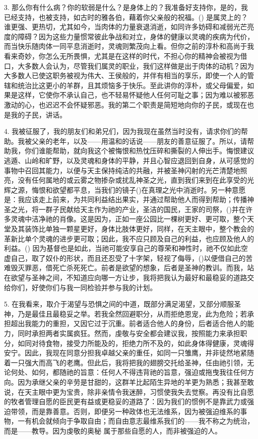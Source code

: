 3. 那么你有什么病？你的软弱是什么？是身体上的？我准备好支持你，是的，我已经支持，也被支持，如古时的雅各伯，藉着你父亲般的祝福。() 是属灵上的？谁更强、更热切，尤其如今，当肉体的力量衰退消逝，如同许多妨碍和减弱光芒亮度的障碍？因为这些力量惯常彼此争战和对立，身体的健康以灵魂的疾病为代价，而当快乐随肉体一同平息消逝时，灵魂则繁茂向上看。但你之前的淳朴和高尚于我看来奇妙，你怎么无所畏惧，尤其是在这样的时代，不担心你的精神会被视为借口，大多数人会认为，尽管我们属灵的职业，我们这样做是出于肉体的动机？因为大多数人已使这职务被视为伟大、王侯般的，并伴有相当的享乐，即使一个人的管辖和统治比这更小的羊群，且其烦恼多于快乐。至此讲你的淳朴，或父母偏爱，如果是这样，它使你不承认自己，也不轻易怀疑他人任何可耻之事；因为难以被邪恶激动的心，也迟迟不会怀疑邪恶。我的第二个职责是简短地向你的子民，或现在也是我的子民，讲话。\par

4. 我被征服了，我的朋友们和弟兄们，因为我现在虽然当时没有，请求你们的帮助。我被父亲的老年，以及——用温和的话说——朋友的善意征服了。所以，请帮助我，你们谁能帮助，就向我这个被悔恨和热忱压碎和撕裂的人伸出手。悔恨建议逃遁、山岭和旷野，以及灵魂和身体的平静，并且心智应退回到自身，从可感觉的事物中召回其能力，以便与天主保持纯洁的共融，并被圣神闪射的光芒清楚地照亮，没有任何属地的或云雾之物掺杂或扰乱神圣之光，直到我们来到在此享受的光辉之源，悔恨和欲望都平息，当我们的镜子()在真理之光中消逝时。另一种意愿是：我应该走上前来，为共同利益结出果实，并通过帮助他人而得到帮助；传播神圣之光，将一群子民献给天主作为祂的产业，圣洁的国民，王家的司祭，()并在许多灵魂中洁净祂的肖像。这是因为，正如一座公园比一棵树更好、更可取，整个天堂及其装饰比单独一颗星更好，身体比肢体更好，同样，在天主眼中，整个教会的革新比单个灵魂的进步更可取；因此，我不应只顾及自己的利益，也应顾及他人的利益。() 因为基督也是如此，当祂可能安享自己的尊荣和神性时，祂不仅如此空虚自己，取了奴仆的形状，而且还忍受了十字架，轻视了侮辱，()以便借自己的苦难毁灭罪恶，借死亡杀死死亡。前者是欲望的想象，后者是圣神的教训。而我，站在欲望与圣神之间，不知道应向哪一方让步，我将把我认为最好和最稳妥的道路交给你们，好使你们与我一同检验并参与我的计划。\par

5. 在我看来，取介于渴望与恐惧之间的中道，既部分满足渴望，又部分顺服圣神，乃是最佳且最稳妥之举。若我全然回避职分，从而拒绝恩宠，此为危险；若承担超出我能力的重担，又因它过于沉重。前者适合他人的身份，后者适合他人的能力，同时承担两者实属疯狂。然而，虔敬与安全都会建议我，按照能力来承担职分，如同对待食物，接受力所能及的，拒绝力所不及的，如此身体得健康，灵魂得安宁。因此，我现在同意分担我卓越父亲的重任，如同一只雏鹰，并非徒然地紧随着一只强大而高飞的老鹰。但此后，我将把我的翅膀交托给圣神，任由祂引领，无论何处、如何，都随祂的旨意：任何人不得违背祂的旨意，强迫或拖曳我往任何方向。因为承继父亲的辛劳是甘甜的，这群羊比起陌生异地的羊更为熟悉；我甚至敢说，在天主眼中更为宝贵，除非亲情令我迷醉，习惯使我失去觉察。再没有比自愿的牧者管理自愿的臣民更有益或更稳妥的道路了：因为我们的惯例不是靠武力或强迫带领，而是靠善意。否则，即便另一种政体也无法维系，因为被强迫维系的事物，一有机会就倾向于争取自由；而自由意志最维系我们的——我不称之为统治，而是——教导。因为虔敬的奥秘  属于那些自愿的人，而非被强迫的人。\par

